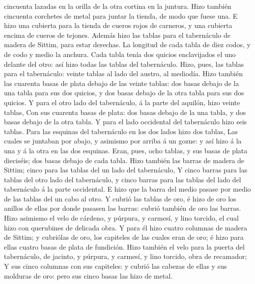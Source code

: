 cincuenta lazadas en la orilla de la otra cortina en la juntura.
 Hizo también cincuenta corchetes de metal para juntar la
tienda, de modo que fuese una.  E hizo una cubierta para la
tienda de cueros rojos de carneros, y una cubierta encima de cueros de
tejones.  Además hizo las tablas para el tabernáculo de
madera de Sittim, para estar derechas.  La longitud de cada
tabla de diez codos, y de codo y medio la anchura.  Cada
tabla tenía dos quicios enclavijados el uno delante del otro: así hizo
todas las tablas del tabernáculo.  Hizo, pues, las tablas
para el tabernáculo: veinte tablas al lado del austro, al mediodía.
 Hizo también las cuarenta basas de plata debajo de las
veinte tablas: dos basas debajo de la una tabla para sus dos quicios, y
dos basas debajo de la otra tabla para sus dos quicios.  Y
para el otro lado del tabernáculo, á la parte del aquilón, hizo veinte
tablas,  Con sus cuarenta basas de plata: dos basas debajo
de la una tabla, y dos basas debajo de la otra tabla.  Y
para el lado occidental del tabernáculo hizo seis tablas. 
Para las esquinas del tabernáculo en los dos lados hizo dos tablas,
 Las cuales se juntaban por abajo, y asimismo por arriba á
un gozne: y así hizo á la una y á la otra en las dos esquinas.
 Eran, pues, ocho tablas, y sus basas de plata dieciséis;
dos basas debajo de cada tabla.  Hizo también las barras de
madera de Sittim; cinco para las tablas del un lado del tabernáculo,
 Y cinco barras para las tablas del otro lado del
tabernáculo, y cinco barras para las tablas del lado del tabernáculo á
la parte occidental.  E hizo que la barra del medio pasase
por medio de las tablas del un cabo al otro.  Y cubrió las
tablas de oro, é hizo de oro los anillos de ellas por donde pasasen las
barras: cubrió también de oro las barras.  Hizo asimismo el
velo de cárdeno, y púrpura, y carmesí, y lino torcido, el cual hizo con
querubines de delicada obra.  Y para él hizo cuatro
columnas de madera de Sittim; y cubriólas de oro, los capiteles de las
cuales eran de oro; é hizo para ellas cuatro basas de plata de
fundición.  Hizo también el velo para la puerta del
tabernáculo, de jacinto, y púrpura, y carmesí, y lino torcido, obra de
recamador;  Y sus cinco columnas con sus capiteles: y
cubrió las cabezas de ellas y sus molduras de oro: pero sus cinco basas
las hizo de metal.

